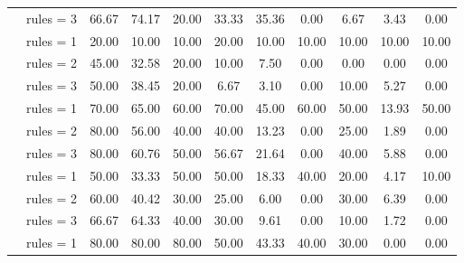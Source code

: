\begin{table*}[t]
{\begin{tabular}{l c ccc ccc ccc}
           & \cellcolor{SeaGreen3!30}rules = 3 & \cellcolor{SeaGreen3!30}66.67 & \cellcolor{SeaGreen3!30}74.17 & \cellcolor{SeaGreen3!30}20.00 & \cellcolor{SeaGreen3!30}33.33 & \cellcolor{SeaGreen3!30}35.36 & \cellcolor{SeaGreen3!30}0.00 & \cellcolor{SeaGreen3!30}6.67 & \cellcolor{SeaGreen3!30}3.43 & \cellcolor{SeaGreen3!30}0.00 \\
           \hdashline
           \multirow{3}{*}{Llama-3.1 405B} & rules = 1 & 20.00 & 10.00 & 10.00 & 20.00 & 10.00 & 10.00 & 10.00 & 10.00 & 10.00\\
           & rules = 2 & 45.00 & 32.58 & 20.00 & 10.00 & 7.50 & 0.00 & 0.00 & 0.00 & 0.00\\
           & \cellcolor{SeaGreen3!30}rules = 3 & \cellcolor{SeaGreen3!30}50.00 & \cellcolor{SeaGreen3!30}38.45 & \cellcolor{SeaGreen3!30}20.00 & \cellcolor{SeaGreen3!30}6.67 & \cellcolor{SeaGreen3!30}3.10 & \cellcolor{SeaGreen3!30}0.00 & \cellcolor{SeaGreen3!30}10.00 & \cellcolor{SeaGreen3!30}5.27 & \cellcolor{SeaGreen3!30}0.00\\
           \hdashline
           \multirow{3}{*}{DeepSeek-V3} & rules = 1 & 70.00 & 65.00 & 60.00 & 70.00 & 45.00 & 60.00 & 50.00 & 13.93 & 50.00\\
           & rules = 2 & 80.00 & 56.00 & 40.00 & 40.00 & 13.23 & 0.00 & 25.00 & 1.89 & 0.00\\
           & \cellcolor{SeaGreen3!30}rules = 3 & \cellcolor{SeaGreen3!30}80.00 & \cellcolor{SeaGreen3!30}60.76 & \cellcolor{SeaGreen3!30}50.00 & \cellcolor{SeaGreen3!30}56.67 & \cellcolor{SeaGreen3!30}21.64 & \cellcolor{SeaGreen3!30}0.00 & \cellcolor{SeaGreen3!30}40.00 & \cellcolor{SeaGreen3!30}5.88 & \cellcolor{SeaGreen3!30}0.00\\
           \hdashline
           \multirow{3}{*}{GPT-4o} & rules = 1 & 50.00 & 33.33 & 50.00 & 50.00 & 18.33 & 40.00 & 20.00 & 4.17 & 10.00\\
           & rules = 2 & 60.00 & 40.42 & 30.00 & 25.00 & 6.00 & 0.00 & 30.00 & 6.39 & 0.00 \\
           & \cellcolor{SeaGreen3!30}rules = 3 & \cellcolor{SeaGreen3!30}66.67 & \cellcolor{SeaGreen3!30}64.33 & \cellcolor{SeaGreen3!30}40.00 & \cellcolor{SeaGreen3!30}30.00 & \cellcolor{SeaGreen3!30}9.61 & \cellcolor{SeaGreen3!30}0.00 & \cellcolor{SeaGreen3!30}10.00 & \cellcolor{SeaGreen3!30}1.72 & \cellcolor{SeaGreen3!30}0.00\\
           \hdashline
           \multirow{3}{*}{o1-mini} & rules = 1 & 80.00 & 80.00 & 80.00 & 50.00 & 43.33 & 40.00 & 30.00 & 0.00 & 0.00\\

\end{tabular}}
\end{table*}
